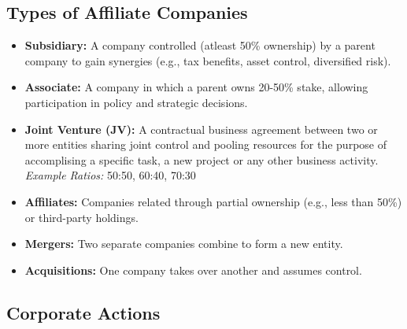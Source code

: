 \documentclass[12pt]{article}
\begin{document}
\subsection{Types of Affiliate Companies}

\begin{itemize}
    \item \textbf{Subsidiary:} A company controlled (atleast 50\% ownership) by a parent company to gain synergies (e.g., tax benefits, asset control, diversified risk).

    \item \textbf{Associate:} A company in which a parent owns 20-50\% stake, allowing participation in policy and strategic decisions.

    \item \textbf{Joint Venture (JV):} A contractual business agreement between two or more entities sharing joint control and pooling resources for the purpose of accomplising a specific task, a new project or any other business activity. \textit{Example Ratios:} 50:50, 60:40, 70:30

    \item \textbf{Affiliates:} Companies related through partial ownership (e.g., less than 50\%) or third-party holdings.

    \item \textbf{Mergers:} Two separate companies combine to form a new entity.

    \item \textbf{Acquisitions:} One company takes over another and assumes control.
\end{itemize}

\subsection{Corporate Actions}
\end{document}
